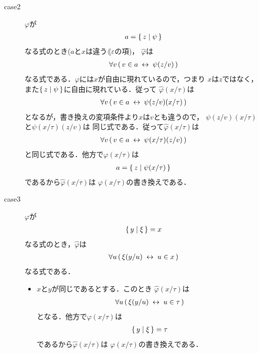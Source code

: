 \begin{metaprf}[第一]
\begin{description}
\begin{description}
					\item[case2] $\varphi$が
						\begin{align}
							a = \{\, z \mid \psi\, \}
						\end{align}
						なる式のとき($a$と$x$は違う$\lang{\varepsilon}$の項)，
						$\widehat{\varphi}$は
						\begin{align}
							\forall v\, (\, v \in a \hspace{0.25em}\leftrightarrow\hspace{0.25em} \psi(z/v)\, )
						\end{align}
						なる式である．$\varphi$には$x$が自由に現れているので，つまり
						$x$は$z$ではなく，また$\{\, z \mid \psi\, \}$に自由に現れている．従って
						$\widehat{\varphi}(x/\tau)$は
						\begin{align}
							\forall v\, (\, v \in a \hspace{0.25em}\leftrightarrow\hspace{0.25em} \psi(z/v)(x/\tau)\, )
						\end{align}
						となるが，書き換えの変項条件より$x$は$v$とも違うので，
						$\psi(z/v)(x/\tau)$と$\psi(x/\tau)(z/v)$は
						同じ式である．従って$\widehat{\varphi}(x/\tau)$は
						\begin{align}
							\forall v\, (\, v \in a \hspace{0.25em}\leftrightarrow\hspace{0.25em} \psi(x/\tau)(z/v)\, )
						\end{align}
						と同じ式である．他方で$\varphi(x/\tau)$は
						\begin{align}
							a = \{\, z \mid \psi(x/\tau)\, \}
						\end{align}
						であるから$\widehat{\varphi}(x/\tau)$は
						$\varphi(x/\tau)$の書き換えである．
					
					\item[case3] $\varphi$が
						\begin{align}
							\{\, y \mid \xi\, \} = x
						\end{align}
						なる式のとき，$\widehat{\varphi}$は
						\begin{align}
							\forall u\, (\, \xi(y/u) \hspace{0.25em}\leftrightarrow\hspace{0.25em} u \in x\, )
						\end{align}
						なる式である．
						\begin{itemize}
							\item $x$と$y$が同じであるとする．このとき
								$\widehat{\varphi}(x/\tau)$は
								\begin{align}
									\forall u\, (\, \xi(y/u) \hspace{0.25em}\leftrightarrow\hspace{0.25em} u \in \tau\, )
								\end{align}
								となる．他方で$\varphi(x/\tau)$は
								\begin{align}
									\{\, y \mid \xi\, \} = \tau
								\end{align}
								であるから$\widehat{\varphi}(x/\tau)$は
								$\varphi(x/\tau)$の書き換えである．
								

\end{itemize}
\end{description}
\end{description}
\end{metaprf}
